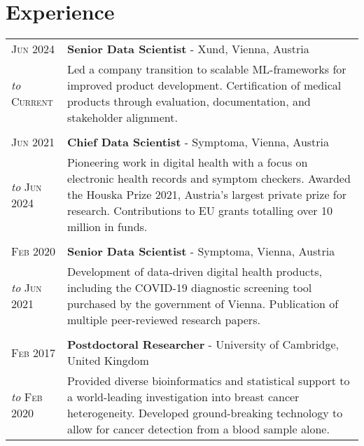 \section{Experience}
\begin{tabular}{>{\raggedleft}p{2.15cm}|p{12cm}}

	\textsc{Jun 2024} &  \textbf{Senior Data Scientist} - Xund, Vienna, Austria \\
	\emph{to} \textsc{Current} & Led a company transition to scalable ML-frameworks for improved product development. Certification of medical products through evaluation, documentation, and stakeholder alignment. \\
	\multicolumn{2}{c}{}\\

	\textsc{Jun 2021} &  \textbf{Chief Data Scientist} - Symptoma, Vienna, Austria \\
	\emph{to} \textsc{Jun 2024} & Pioneering work in digital health with a focus on electronic health records and symptom checkers. Awarded the Houska Prize 2021, Austria's largest private prize for research. Contributions to EU grants totalling over 10 million in funds. \\

	\multicolumn{2}{c}{}\\

    \textsc{Feb 2020} & \textbf{Senior Data Scientist} - Symptoma, Vienna, Austria \\
	\emph{to} \textsc{Jun 2021} & Development of data-driven digital health products, including the COVID-19 diagnostic screening tool purchased by the government of Vienna. Publication of multiple peer-reviewed research papers. \\
	\multicolumn{2}{c}{}\\


    \textsc{Feb 2017} &  \textbf{Postdoctoral Researcher} - University of Cambridge, United Kingdom\\
	\emph{to} \textsc{Feb 2020} & Provided diverse bioinformatics and statistical support to a world-leading investigation into breast cancer heterogeneity. Developed ground-breaking technology to allow for cancer detection from a blood sample alone. \\




\end{tabular}
